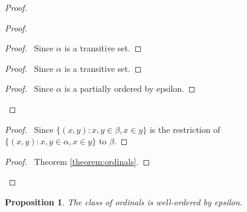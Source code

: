 \documentclass{report}
\let\qed\relax
\newtheorem{proposition}[axiom]{Proposition}
\theoremstyle{definition}
\begin{document}
    \begin{proof}
        \pf
        \begin{proof}
            \begin{proof}
                \pf\ Since $\alpha$ is a transitive set.
            \end{proof}
            \begin{proof}
                \pf\ Since $\alpha$ is a transitive set.
            \end{proof}
            \begin{proof}
                \pf\ Since $\alpha$ is a partially ordered by epsilon.
            \end{proof}
        \end{proof}
        \begin{proof}
            \pf\ Since $\{ (x,y) : x,y \in \beta, x \in y \}$ is the restriction of
            $\{ (x,y) : x,y \in \alpha, x \in y \}$ to $\beta$.
        \end{proof}
        \begin{proof}
            \pf\ Theorem \ref{theorem:ordinals}.
        \end{proof}
        \qed
    \end{proof}

    \begin{proposition}
        The class of ordinals is well-ordered by epsilon.
    \end{proposition}
\end{document}
